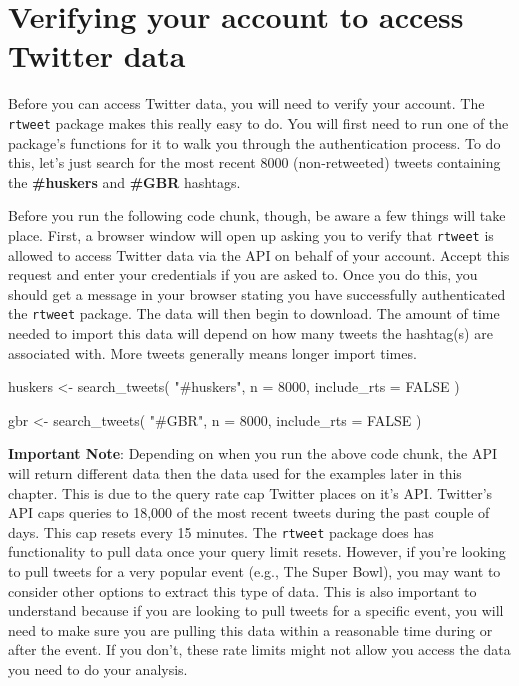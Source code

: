 \documentclass[
  letterpaper,
  DIV=11,
  numbers=noendperiod]{scrreprt}
\newenvironment{Shaded}{\begin{snugshade}}{\end{snugshade}}
\newcommand{\AttributeTok}[1]{\textcolor[rgb]{0.40,0.45,0.13}{#1}}
\newcommand{\ConstantTok}[1]{\textcolor[rgb]{0.56,0.35,0.01}{#1}}
\newcommand{\DecValTok}[1]{\textcolor[rgb]{0.68,0.00,0.00}{#1}}
\newcommand{\FunctionTok}[1]{\textcolor[rgb]{0.28,0.35,0.67}{#1}}
\newcommand{\NormalTok}[1]{\textcolor[rgb]{0.00,0.23,0.31}{#1}}
\newcommand{\OtherTok}[1]{\textcolor[rgb]{0.00,0.23,0.31}{#1}}
\newcommand{\StringTok}[1]{\textcolor[rgb]{0.13,0.47,0.30}{#1}}
\begin{document}
\hypertarget{verifying-your-account-to-access-twitter-data}{%
\section{Verifying your account to access Twitter
data}\label{verifying-your-account-to-access-twitter-data}}

Before you can access Twitter data, you will need to verify your
account. The \texttt{rtweet} package makes this really easy to do. You
will first need to run one of the package's functions for it to walk you
through the authentication process. To do this, let's just search for
the most recent 8000 (non-retweeted) tweets containing the
\textbf{\#huskers} and \textbf{\#GBR} hashtags.

Before you run the following code chunk, though, be aware a few things
will take place. First, a browser window will open up asking you to
verify that \texttt{rtweet} is allowed to access Twitter data via the
API on behalf of your account. Accept this request and enter your
credentials if you are asked to. Once you do this, you should get a
message in your browser stating you have successfully authenticated the
\texttt{rtweet} package. The data will then begin to download. The
amount of time needed to import this data will depend on how many tweets
the hashtag(s) are associated with. More tweets generally means longer
import times.

\begin{Shaded}
\begin{Highlighting}[]
\NormalTok{huskers }\OtherTok{\textless{}{-}} \FunctionTok{search\_tweets}\NormalTok{(}
  \StringTok{"\#huskers"}\NormalTok{, }\AttributeTok{n =} \DecValTok{8000}\NormalTok{, }\AttributeTok{include\_rts =} \ConstantTok{FALSE}
\NormalTok{)}

\NormalTok{gbr }\OtherTok{\textless{}{-}} \FunctionTok{search\_tweets}\NormalTok{(}
  \StringTok{"\#GBR"}\NormalTok{, }\AttributeTok{n =} \DecValTok{8000}\NormalTok{, }\AttributeTok{include\_rts =} \ConstantTok{FALSE}
\NormalTok{)}
\end{Highlighting}
\end{Shaded}

\textbf{Important Note}: Depending on when you run the above code chunk,
the API will return different data then the data used for the examples
later in this chapter. This is due to the query rate cap Twitter places
on it's API. Twitter's API caps queries to 18,000 of the most recent
tweets during the past couple of days. This cap resets every 15 minutes.
The \texttt{rtweet} package does has functionality to pull data once
your query limit resets. However, if you're looking to pull tweets for a
very popular event (e.g., The Super Bowl), you may want to consider
other options to extract this type of data. This is also important to
understand because if you are looking to pull tweets for a specific
event, you will need to make sure you are pulling this data within a
reasonable time during or after the event. If you don't, these rate
limits might not allow you access the data you need to do your analysis.
\end{document}
